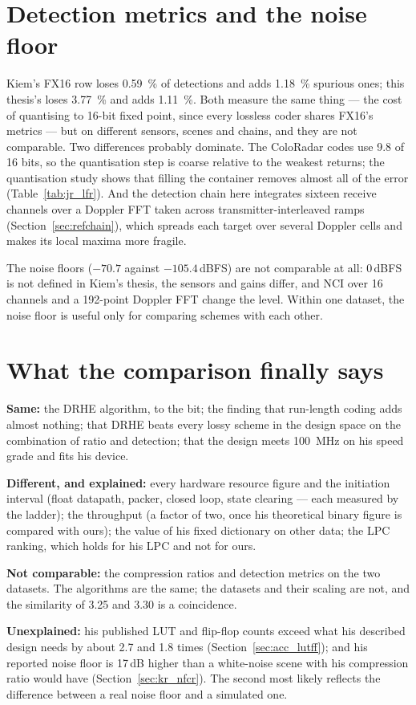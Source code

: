 \section{Detection metrics and the noise floor}
\label{sec:kc_det}

Kiem's FX16 row loses \SI{0.59}{\percent} of detections and adds
\SI{1.18}{\percent} spurious ones; this thesis's loses \SI{3.77}{\percent} and
adds \SI{1.11}{\percent}. Both measure the same thing --- the cost of quantising
to 16-bit fixed point, since every lossless coder shares FX16's metrics --- but on
different sensors, scenes and chains, and they are not comparable. Two
differences probably dominate. The ColoRadar codes use 9.8 of 16 bits, so the
quantisation step is coarse relative to the weakest returns; the quantisation
study shows that filling the container removes almost all of the error
(Table~\ref{tab:jr_lfr}). And the detection chain here integrates sixteen
receive channels over a Doppler FFT taken across transmitter-interleaved ramps
(Section~\ref{sec:refchain}), which spreads each target over several Doppler
cells and makes its local maxima more fragile.

The noise floors ($-70.7$ against $-105.4$\,dBFS) are not comparable at all:
0\,dBFS is not defined in Kiem's thesis, the sensors and gains differ, and NCI
over 16 channels and a 192-point Doppler FFT change the level. Within one
dataset, the noise floor is useful only for comparing schemes with each other.

\section{What the comparison finally says}
\label{sec:kc_summary}

\begin{keybox}
\textbf{Same:} the DRHE algorithm, to the bit; the finding that run-length
coding adds almost nothing; that DRHE beats every lossy scheme in the design
space on the combination of ratio and detection; that the design meets
\SI{100}{\mega\hertz} on his speed grade and fits his device.

\textbf{Different, and explained:} every hardware resource figure and the
initiation interval (float datapath, packer, closed loop, state clearing ---
each measured by the ladder); the throughput (a factor of two, once his
theoretical binary figure is compared with ours); the value of his fixed
dictionary on other data; the LPC ranking, which holds for his LPC and not for
ours.

\textbf{Not comparable:} the compression ratios and detection metrics on the
two datasets. The algorithms are the same; the datasets and their scaling are
not, and the similarity of 3.25 and 3.30 is a coincidence.

\textbf{Unexplained:} his published LUT and flip-flop counts exceed what his
described design needs by about 2.7 and 1.8 times (Section~\ref{sec:acc_lutff});
and his reported noise floor is 17\,dB higher than a white-noise scene with his
compression ratio would have (Section~\ref{sec:kr_nfcr}). The second most
likely reflects the difference between a real noise floor and a simulated one.
\end{keybox}
